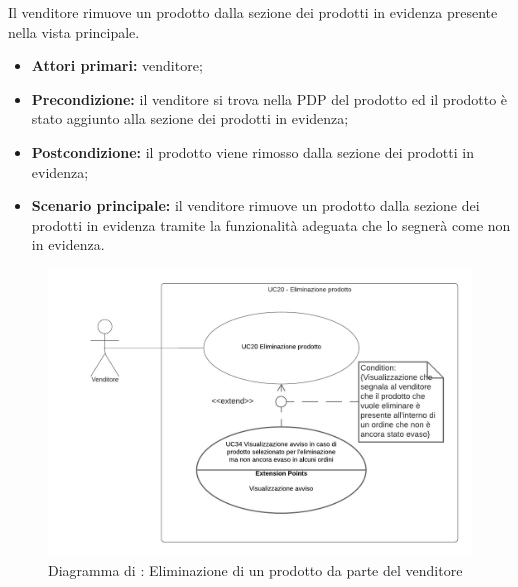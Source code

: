 Il venditore rimuove un prodotto dalla sezione dei prodotti in evidenza presente nella vista principale.
\begin{itemize}
    \item \textbf{Attori primari:} venditore;
    \item \textbf{Precondizione:} il venditore si trova nella PDP del prodotto ed il prodotto è stato aggiunto alla sezione dei prodotti in evidenza;
    \item \textbf{Postcondizione:} il prodotto viene rimosso dalla sezione dei prodotti in evidenza; 
    \item \textbf{Scenario principale:} il venditore rimuove un prodotto dalla sezione dei prodotti in evidenza tramite la funzionalità adeguata che lo segnerà come non in evidenza.
\end{itemize}

\begin{figure}[H]
    \centering
    \includegraphics[width=\textwidth]{Immagini/DiagrammiUC/UC20EliminazioneProdotto}
    \caption{Diagramma di \actualUC: Eliminazione di un prodotto da parte del venditore} 
    \label{fig:EliminazioneProdotto}
\end{figure}

